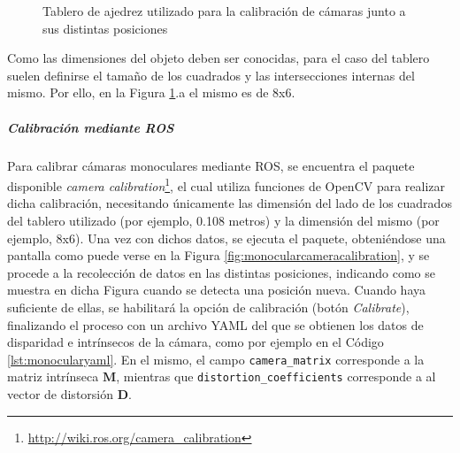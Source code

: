 \begin{figure}
    \centering
    \qquad
    \caption{Tablero de ajedrez utilizado para la calibración de cámaras junto a sus distintas posiciones}
    \label{fig:chessboardcalibration}
\end{figure}

Como las dimensiones del objeto deben ser conocidas, para el caso del tablero suelen definirse el tamaño de los cuadrados y las intersecciones internas del mismo. Por ello, en la Figura \ref{fig:chessboardcalibration}.a el mismo es de 8x6.

\subparagraph{Calibración mediante ROS}
Para calibrar cámaras monoculares mediante ROS, se encuentra el paquete disponible \textit{camera calibration}\footnote{\url{http://wiki.ros.org/camera_calibration}}, el cual utiliza funciones de OpenCV para realizar dicha calibración, necesitando únicamente las dimensión del lado de los cuadrados del tablero utilizado (por ejemplo, 0.108 metros) y la dimensión del mismo (por ejemplo, 8x6). Una vez con dichos datos, se ejecuta el paquete, obteniéndose una pantalla como puede verse en la Figura \ref{fig:monocularcameracalibration}, y se procede a la recolección de datos en las distintas posiciones, indicando como se muestra en dicha Figura cuando se detecta una posición nueva. Cuando haya suficiente de ellas, se habilitará la opción de calibración (botón \textit{Calibrate}), finalizando el proceso con un archivo YAML del que se obtienen los datos de disparidad e intrínsecos de la cámara, como por ejemplo en el Código \ref{lst:monocularyaml}. En el mismo, el campo \texttt{camera\_matrix} corresponde a la matriz intrínseca $\bm{M}$, mientras que \texttt{distortion\_coefficients} corresponde a al vector de distorsión $\bm{D}$.

